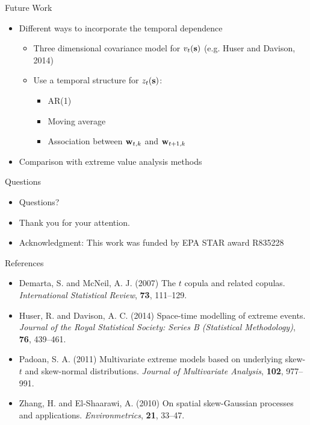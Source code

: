 \documentclass{beamer}
\begin{document}
\begin{frame}{Future Work}
  \begin{itemize} \setlength{\itemsep}{0.5em}
    \item Different ways to incorporate the temporal dependence
    \begin{itemize}
    	\item Three dimensional covariance model for $v_t(\mbox{\bf s})$ (e.g. Huser and Davison, 2014)
    	\item Use a temporal structure for $z_t(\mbox{\bf s})$:
	\begin{itemize}
		\item AR(1)
		\item Moving average 
		\item Association between $\mbox{\bf w}_{t, k}$ and $\mbox{\bf w}_{t+1, k}$
	\end{itemize}
    \end{itemize}
     \item Comparison with extreme value analysis methods
  \end{itemize}
\end{frame}

\begin{frame}{Questions}
  \begin{itemize} \setlength{\itemsep}{0.5em}
    \item Questions?
    \item Thank you for your attention.
    \item Acknowledgment: This work was funded by EPA STAR award R835228
  \end{itemize}
\end{frame}

\begin{frame}{References}
  \begin{itemize} \setlength{\itemsep}{0.5em}
    \item Demarta, S. and McNeil, A. J. (2007) The $t$ copula and related copulas. {\it International Statistical Review}, {\bf 73}, 111--129.
    \item Huser, R. and Davison, A. C. (2014) Space-time modelling of extreme events. {\it Journal of the Royal Statistical Society: Series B (Statistical Methodology)}, {\bf 76}, 439--461.
    \item Padoan, S. A. (2011) Multivariate extreme models based on underlying skew-$t$ and skew-normal distributions. {\it Journal of Multivariate Analysis}, {\bf 102}, 977--991.
    \item Zhang, H. and El-Shaarawi, A. (2010) On spatial skew-Gaussian processes and applications. {\it Environmetrics}, {\bf 21}, 33--47.
  \end{itemize}
\end{frame}
\end{document}
